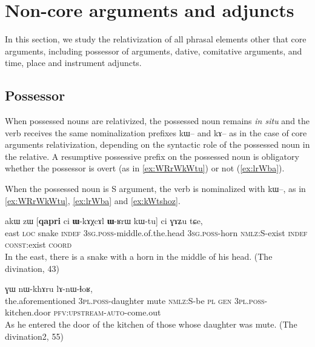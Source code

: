 \documentclass[oldfontcommands,oneside,a4paper,11pt]{article}
\newcommand{\ipa}[1]{{\phon #1}} %
\begin{document}
  

\section{Non-core arguments and adjuncts} \label{sec:oblique}
In this section, we study the relativization of all phrasal elements other that core arguments, including possessor of arguments, dative, comitative arguments, and time, place and instrument adjuncts.


\subsection{Possessor} \label{sec:possessor}

When possessed nouns are relativized, the possessed noun remains \textit{in situ} and the verb receives the same nominalization prefixes   \ipa{kɯ}-- and \ipa{kɤ}-- as in the case of core arguments relativization, depending on the syntactic role of the possessed noun in the relative. A resumptive possessive prefix on the possessed noun is obligatory whether the possessor is overt (as in \ref{ex:WRrWkWtu}) or not (\ref{ex:lrWba}).

When the possessed noun is S argument, the verb is nominalized with \ipa{kɯ}--, as in \ref{ex:WRrWkWtu}, \ref{ex:lrWba} and \ref{ex:kWtshoz}.

      \begin{exe}
   \ex \label{ex:WRrWkWtu}
 \gll 
\ipa{akɯ}   	\ipa{zɯ}   	[\textbf{\ipa{qapri} }  	\ipa{ci}   	\ipa{\textbf{ɯ}-kɤχcɤl}   	\ipa{\textbf{ɯ}-ʁrɯ}   	\ipa{kɯ-tu}]   	\ipa{ci}   	\ipa{ɣɤʑu}   	\ipa{tɕe,}   \\
east \textsc{loc} snake \textsc{indef} \textsc{3sg.poss}-middle.of.the.head  \textsc{3sg.poss}-horn \textsc{nmlz:S}-exist \textsc{indef} \textsc{const}:exist \textsc{coord} \\
\glt In the east, there is a snake with a horn in the middle of his head.  (The divination, 43)
\end{exe}
 
       \begin{exe}
   \ex \label{ex:lrWba}
 \gll 
[\ipa{iɕqha}   	 \ipa{\textbf{nɯ}-me}   	\ipa{lʁɯba}   	\ipa{kɯ-ŋu}]   	\ipa{ra}   	\ipa{ɣɯ}   	\ipa{nɯ-khɤru}   	\ipa{lɤ-nɯ-ɬoʁ,}   \\
the.aforementioned \textsc{3pl.poss}-daughter mute \textsc{nmlz:S}-be \textsc{pl} \textsc{gen} \textsc{3pl.poss}-kitchen.door \textsc{pfv:upstream-auto}-come.out \\
\glt  As he entered the  door of the kitchen of those whose daughter was mute.  (The divination2, 55)
\end{exe}
 
\end{document}
